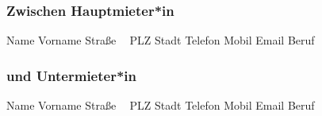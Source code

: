 \setlength{\columnsep}{2em}
\begin{multicols}{2}

\subsubsection*{Zwischen Hauptmieter*in}

\ifthenelse{\equal{\HAUPTMIETERlastname}{}}
{}
{Name \MYdotfill \textbf{ \HAUPTMIETERlastname }\newline} 
%
\ifthenelse{\equal{\HAUPTMIETERfirstname}{}}
{}
{Vorname \MYdotfill \textbf{ \HAUPTMIETERfirstname }\newline} 
%
\ifthenelse{\equal{\HAUPTMIETERstreet}{}}
{}
{Straße \MYdotfill \textbf{ \HAUPTMIETERstreet~\HAUPTMIETERstreetnumber }\newline} 
%
\ifthenelse{\equal{\HAUPTMIETERzipcode}{}}
{}
{PLZ \MYdotfill \textbf{ \HAUPTMIETERzipcode }\newline} 
%
\ifthenelse{\equal{\HAUPTMIETERcity}{}}
{}
{Stadt \MYdotfill \textbf{ \HAUPTMIETERcity }\newline} 
%
\ifthenelse{\equal{\HAUPTMIETERphone}{}}
{}
{Telefon \MYdotfill \textbf{ \HAUPTMIETERphone }\newline} 
%
\ifthenelse{\equal{\HAUPTMIETERmobile}{}}
{}
{Mobil \MYdotfill \textbf{ \HAUPTMIETERmobile }\newline} 
%
\ifthenelse{\equal{\HAUPTMIETERmail}{}}
{}
{Email \MYdotfill \textbf{ \HAUPTMIETERmail }\newline} 
%
\ifthenelse{\equal{\HAUPTMIETERjob}{}}
{}
{Beruf \MYdotfill \textbf{ \HAUPTMIETERjob }\newline} 

\columnbreak

\subsubsection*{und Untermieter*in}

\ifthenelse{\equal{\MIETERlastname}{}}
{}
{Name \MYdotfill \textbf{ \MIETERlastname }\newline} 
%
\ifthenelse{\equal{\MIETERfirstname}{}}
{}
{Vorname \MYdotfill \textbf{ \MIETERfirstname }\newline} 
%
\ifthenelse{\equal{\MIETERstreet}{}}
{}
{Straße \MYdotfill \textbf{ \MIETERstreet~\MIETERstreetnumber }\newline} 
%
\ifthenelse{\equal{\MIETERzipcode}{}}
{}
{PLZ \MYdotfill \textbf{ \MIETERzipcode }\newline} 
%
\ifthenelse{\equal{\MIETERcity}{}}
{}
{Stadt \MYdotfill \textbf{ \MIETERcity }\newline} 
%
\ifthenelse{\equal{\MIETERphone}{}}
{}
{Telefon \MYdotfill \textbf{ \MIETERphone }\newline} 
%
\ifthenelse{\equal{\MIETERmobile}{}}
{}
{Mobil \MYdotfill \textbf{ \MIETERmobile }\newline} 
%
\ifthenelse{\equal{\MIETERmail}{}}
{}
{Email \MYdotfill \textbf{ \MIETERmail }\newline} 
%
\ifthenelse{\equal{\MIETERjob}{}}
{}
{Beruf \MYdotfill \textbf{ \MIETERjob }\newline} 

\end{multicols}
